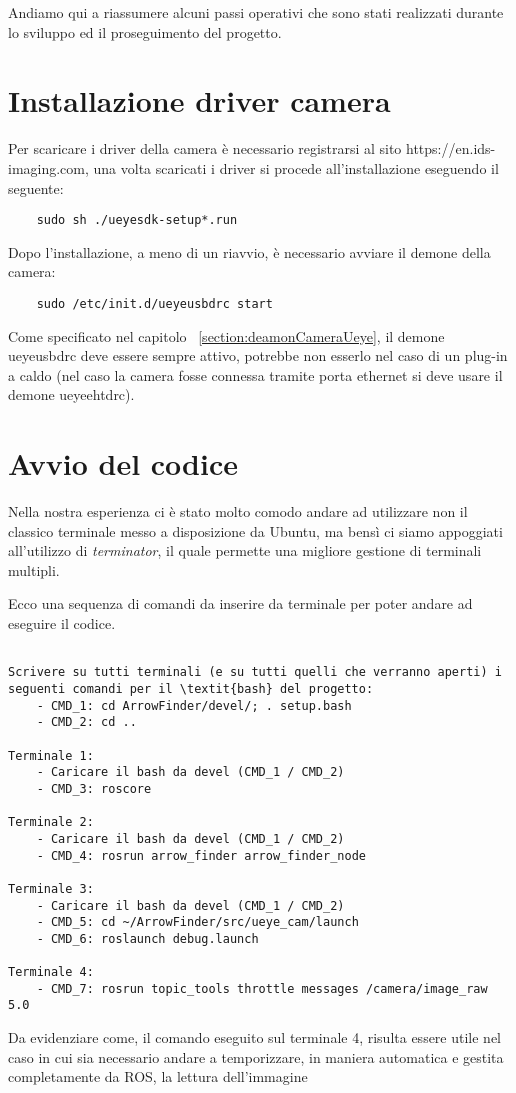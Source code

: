 Andiamo qui a riassumere alcuni passi operativi che sono stati realizzati durante lo sviluppo ed il proseguimento del progetto.

\section{Installazione driver camera}
Per scaricare i driver della camera è necessario registrarsi al sito https://en.ids-imaging.com, una volta scaricati i driver si procede all'installazione eseguendo il seguente:
\begin{lstlisting}
	sudo sh ./ueyesdk-setup*.run
\end{lstlisting}
Dopo l'installazione, a meno di un riavvio, è necessario avviare il demone della camera:
\begin{lstlisting}
	sudo /etc/init.d/ueyeusbdrc start 
\end{lstlisting}
Come specificato nel capitolo ~\ref{section:deamonCameraUeye}, il demone ueyeusbdrc deve essere sempre attivo, potrebbe non esserlo nel caso di un plug-in a caldo (nel caso la camera fosse connessa tramite porta ethernet si deve usare il demone ueyeehtdrc).





\section{Avvio del codice}
Nella nostra esperienza ci è stato molto comodo andare ad utilizzare non il classico terminale messo a disposizione da Ubuntu, ma bensì ci siamo appoggiati all'utilizzo di \textit{terminator}, il quale permette una migliore gestione di terminali multipli.

Ecco una sequenza di comandi da inserire da terminale per poter andare ad eseguire il codice. 
\begin{lstlisting}

Scrivere su tutti terminali (e su tutti quelli che verranno aperti) i seguenti comandi per il \textit{bash} del progetto:
	- CMD_1: cd ArrowFinder/devel/; . setup.bash
	- CMD_2: cd ..

Terminale 1:
	- Caricare il bash da devel (CMD_1 / CMD_2)
	- CMD_3: roscore

Terminale 2:
	- Caricare il bash da devel (CMD_1 / CMD_2)
	- CMD_4: rosrun arrow_finder arrow_finder_node
	
Terminale 3:
	- Caricare il bash da devel (CMD_1 / CMD_2)
	- CMD_5: cd ~/ArrowFinder/src/ueye_cam/launch
	- CMD_6: roslaunch debug.launch 

Terminale 4:
	- CMD_7: rosrun topic_tools throttle messages /camera/image_raw 5.0 
\end{lstlisting}
Da evidenziare come, il comando eseguito sul terminale 4, risulta essere utile nel caso in cui sia necessario andare a temporizzare, in maniera automatica e gestita completamente da ROS, la lettura dell'immagine